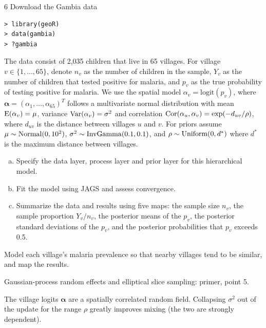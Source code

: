 \documentclass[11pt]{article}
\begin{document}
\begin{problem}{6}
Download the Gambia data
\begin{lstlisting}
> library(geoR)
> data(gambia)
> ?gambia
\end{lstlisting}
The data consist of 2,035 children that live in 65 villages. For village $v\in\{1,\dots,65\}$, denote $n_v$ as the number of children in the sample, $Y_v$ as the number of children that tested positive for malaria, and $p_v$ as the true probability of testing positive for malaria. We use the spatial model $\alpha_v=\mathrm{logit}(p_v)$, where $\bm\alpha=(\alpha_1,\dots,\alpha_{65})^T$ follows a multivariate normal distribution with mean $\mathrm{E}(\alpha_v)=\mu$, variance $\mathrm{Var}(\alpha_v)=\sigma^2$ and correlation $\mathrm{Cor}(\alpha_u,\alpha_v)=\exp(-d_{uv}/\rho)$, where $d_{uv}$ is the distance between villages $u$ and $v$. For priors assume $\mu\sim\mathrm{Normal}(0,10^2)$, $\sigma^2\sim\mathrm{InvGamma}(0.1,0.1)$, and $\rho\sim\mathrm{Uniform}(0,d^*)$ where $d^*$ is the maximum distance between villages.
\begin{enumerate}[(a)]
\item Specify the data layer, process layer and prior layer for this hierarchical model.
\item Fit the model using JAGS and assess convergence.
\item Summarize the data and results using five maps: the sample size $n_v$, the sample proportion $Y_v/n_v$, the posterior means of the $p_v$, the posterior standard deviations of the $p_v$, and the posterior probabilities that $p_v$ exceeds 0.5.
\end{enumerate}
\end{problem}

\begin{restate}
Model each village's malaria prevalence so that nearby villages tend to be similar, and map the results.
\end{restate}

\begin{recall}
Gaussian-process random effects and elliptical slice sampling: primer, point 5.
\end{recall}

\begin{keyidea}
The village logits $\bm\alpha$ are a spatially correlated random field. Collapsing $\sigma^2$ out of the update for the range $\rho$ greatly improves mixing (the two are strongly dependent).
\end{keyidea}
\end{document}
